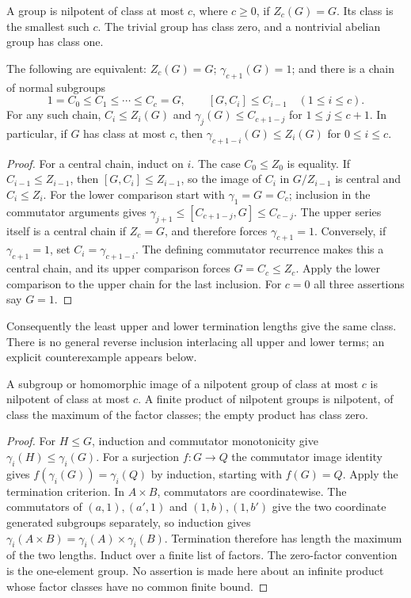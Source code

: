 A group is nilpotent of class at most $c$, where $c\geq0$, if
$Z_c(G)=G$. Its class is the smallest such $c$. The trivial group has
class zero, and a nontrivial abelian group has class one.
\begin{theorem}\label{thm:central-series-criteria}
The following are equivalent: $Z_c(G)=G$; $\gamma_{c+1}(G)=1$; and
there is a chain of normal subgroups
\[
 1=C_0\leq C_1\leq\cdots\leq C_c=G,
 \qquad [G,C_i]\leq C_{i-1}\quad(1\leq i\leq c).
\]
For any such chain, $C_i\leq Z_i(G)$ and
$\gamma_j(G)\leq C_{c+1-j}$ for $1\leq j\leq c+1$.
In particular, if $G$ has class at most $c$, then
$\gamma_{c+1-i}(G)\leq Z_i(G)$ for $0\leq i\leq c$.
\end{theorem}
\begin{proof}
For a central chain, induct on $i$. The case $C_0\leq Z_0$ is equality.
If $C_{i-1}\leq Z_{i-1}$, then
$[G,C_i]\leq Z_{i-1}$, so the image of $C_i$ in $G/Z_{i-1}$ is
central and $C_i\leq Z_i$. For the lower comparison start with
$\gamma_1=G=C_c$; inclusion in the commutator arguments gives
$\gamma_{j+1}\leq[C_{c+1-j},G]\leq C_{c-j}$.
The upper series itself is a central chain if $Z_c=G$, and therefore
forces $\gamma_{c+1}=1$. Conversely, if $\gamma_{c+1}=1$, set
$C_i=\gamma_{c+1-i}$. The defining commutator recurrence makes this
a central chain, and its upper comparison forces $G=C_c\leq Z_c$.
Apply the lower comparison to the upper chain for the last inclusion.
For $c=0$ all three assertions say $G=1$.
\end{proof}
Consequently the least upper and lower termination lengths give the same
class. There is no general reverse inclusion interlacing all upper and
lower terms; an explicit counterexample appears below.

\begin{proposition}\label{prop:nilpotence-closure}
A subgroup or homomorphic image of a nilpotent group of class at most
$c$ is nilpotent of class at most $c$. A finite product of nilpotent
groups is nilpotent, of class the maximum of the factor classes; the empty
product has class zero.
\end{proposition}
\begin{proof}
For $H\leq G$, induction and commutator monotonicity give
$\gamma_i(H)\leq\gamma_i(G)$. For a surjection $f:G\to Q$ the
commutator image identity gives $f(\gamma_i(G))=\gamma_i(Q)$ by
induction, starting with $f(G)=Q$. Apply the termination criterion.
In $A\times B$, commutators are coordinatewise. The commutators of
$(a,1),(a',1)$ and $(1,b),(1,b')$ give the two coordinate generated
subgroups separately, so induction gives
$\gamma_i(A\times B)=\gamma_i(A)\times\gamma_i(B)$.
Termination therefore has length the maximum of the two lengths.
Induct over a finite list of factors. The zero-factor convention is the
one-element group. No assertion is made here about an infinite product
whose factor classes have no common finite bound.
\end{proof}

